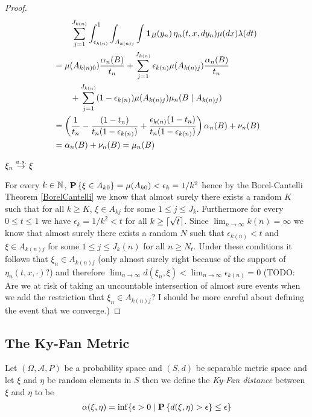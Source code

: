 \begin{proof}
\begin{align*}
& \qquad \sum_{j=1}^{J_{k(n)}} \int_{\epsilon_{k(n)}}^1 \int_{A_{k(n)j}} \int \textbf{1}_{B}(y_n) \, \eta_n(t,x, dy_n) \mu(dx) \lambda(dt) \\
&= \mu(A_{k(n)0}) \frac{\alpha_n(B)}{t_n} + \sum_{j=1}^{J_{k(n)}} \epsilon_{k(n)} \mu(A_{k(n)j})\frac{\alpha_n(B)}{t_n} \\
& \qquad + \sum_{j=1}^{J_{k(n)}} (1 - \epsilon_{k(n)}) \mu(A_{k(n)j}) \mu_n(B \mid A_{k(n)j}) \\
&=\left (\frac{1}{t_n} - \frac{(1-t_n)}{t_n(1- \epsilon_{k(n)})} + \frac{\epsilon_{k(n)} (1- t_n)}{t_n(1 - \epsilon_{k(n)})} \right ) \alpha_n(B) + \nu_n(B) \\
&= \alpha_n(B) + \nu_n(B) = \mu_n(B)
\end{align*}

\begin{clm} $\xi_n \overset{a.s.}\to \xi$
\end{clm}
For every $k \in \mathbb{N}$,  $\textbf{P}\left \{\xi \in A_{k0} \right \} = \mu(A_{k0}) < \epsilon_k = 1/k^2$ hence by the Borel-Cantelli Theorem \ref{BorelCantelli} we know that almost surely there exists a random $K$ such that for all $k \geq K$, $\xi \in A_{kj}$ for some $1 \leq j \leq J_k$.  Furthermore for every $0 \leq t \leq 1$ we have 
$\epsilon_k = 1/k^2 < t$ for all $k \geq \lceil \sqrt{t} \rceil$.  Since $\lim_{n \to \infty} k(n) = \infty$ we know that almost surely there exists a random $N$ such that $\epsilon_{k(n)} < t$ and $\xi \in A_{k(n)j}$ for some $1 \leq j \leq J_k(n)$ for all $n \geq N_t$.  Under these conditions it follows that $\xi_n \in A_{k(n)j}$ (only almost surely right because of the support of $\eta_n(t,x, \cdot)$?) and therefore $\lim_{n \to \infty} d(\xi_n, \xi) < \lim_{n \to \infty}\epsilon_{k(n)} = 0$ (TODO: Are we at risk of taking an uncountable intersection of almost sure events when we add the restriction that $\xi_n \in A_{k(n)j}$? I should be more careful about defining the event that we converge.)
\end{proof}

\subsection{The Ky-Fan Metric}


\begin{defn}Let $(\Omega, \mathcal{A}, P)$ be a probability space and $(S,d)$ be separable metric space and let $\xi$ and $\eta$ be
  random elements in $S$ then we define the \emph{Ky-Fan distance}
  between $\xi$ and $\eta$ to be
\begin{align*}
\alpha(\xi, \eta) = \inf \lbrace \epsilon > 0 \mid \textbf{P}\left \{d(\xi, \eta) > \epsilon \right \} \leq \epsilon \rbrace
\end{align*}
\end{defn}

